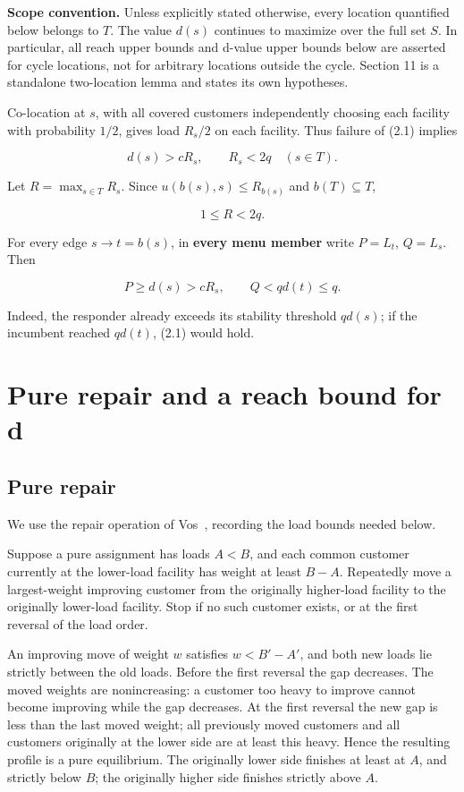 \documentclass[11pt,a4paper]{article}
\begin{document}
\textbf{Scope convention.} Unless explicitly stated otherwise, every location quantified below belongs to \(T\). The value \(d(s)\) continues to maximize over the full set \(S\). In particular, all reach upper bounds and d-value upper bounds below are asserted for cycle locations, not for arbitrary locations outside the cycle. Section 11 is a standalone two-location lemma and states its own hypotheses.

Co-location at \(s\), with all covered customers independently choosing each facility with probability \(1/2\), gives load \(R_s/2\) on each facility. Thus failure of (2.1) implies

\[
d(s)>cR_s,\qquad R_s<2q\quad(s\in T). \tag{2.2}
\]

Let \(R=\max_{s\in T}R_s\). Since \(u(b(s),s)\le R_{b(s)}\) and \(b(T)\subseteq T\),

\[
1\le R<2q. \tag{2.3}
\]

For every edge \(s\to t=b(s)\), in \textbf{every menu member} write \(P=L_t\), \(Q=L_s\). Then

\[
P\ge d(s)>cR_s,\qquad Q<qd(t)\le q. \tag{2.4}
\]

Indeed, the responder already exceeds its stability threshold \(qd(s)\); if the incumbent reached \(qd(t)\), (2.1) would hold.

\hypertarget{pure-repair-leveling-and-a-reach-bound-for-d}{%
\section{Pure repair and a reach bound for d}\label{pure-repair-leveling-and-a-reach-bound-for-d}}

\hypertarget{pure-repair}{%
\subsection{Pure repair}\label{pure-repair}}

We use the repair operation of Vos~\cite[Lemma~29]{vos2023}, recording the load bounds needed below.

Suppose a pure assignment has loads \(A<B\), and each common customer currently at the lower-load facility has weight at least \(B-A\). Repeatedly move a largest-weight improving customer from the originally higher-load facility to the originally lower-load facility. Stop if no such customer exists, or at the first reversal of the load order.

An improving move of weight \(w\) satisfies \(w<B'-A'\), and both new loads lie strictly between the old loads. Before the first reversal the gap decreases. The moved weights are nonincreasing: a customer too heavy to improve cannot become improving while the gap decreases. At the first reversal the new gap is less than the last moved weight; all previously moved customers and all customers originally at the lower side are at least this heavy. Hence the resulting profile is a pure equilibrium. The originally lower side finishes at least at \(A\), and strictly below \(B\); the originally higher side finishes strictly above \(A\).
\end{document}
